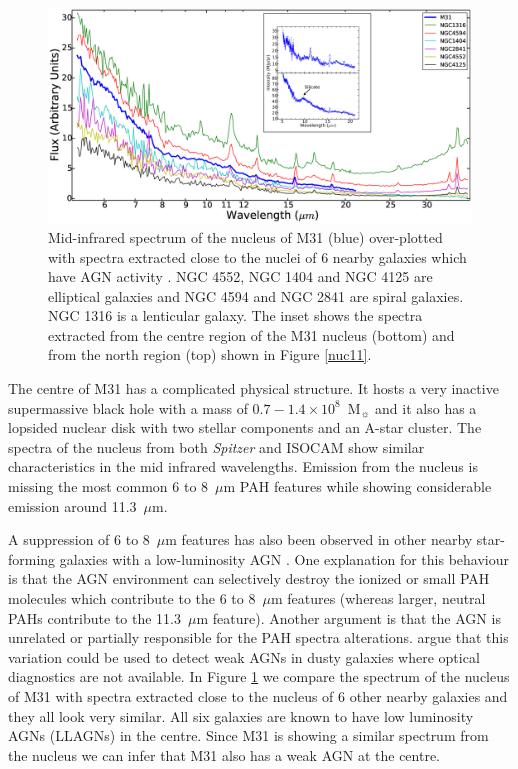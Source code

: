 \begin{figure}
\centering
\includegraphics[height = 8 cm]{./SINGSspec.eps}
\caption{Mid-infrared spectrum of the nucleus of M31 (blue) over-plotted with spectra extracted close to the nuclei of 6 nearby galaxies which have 
AGN activity \citep{Smith:2007lr}. NGC 4552, NGC 1404 and NGC 4125 are elliptical galaxies and NGC 4594 and NGC 2841 are spiral galaxies. 
NGC 1316 is a lenticular galaxy. The inset shows the spectra extracted from the centre region of the M31 nucleus (bottom) and from the north region (top) 
shown in Figure \ref{nuc11}.}
\label{smithspec}
\end{figure}

The centre of M31 has a complicated physical structure. It hosts a very inactive supermassive black hole with a mass of 
$0.7-1.4 \times 10^8$~M$_{\sun}$ \citep{Bacon2001} and it also has a lopsided nuclear disk \citep{Lauer1993} with two stellar components and an A-star cluster. 
The spectra of the nucleus from both {\em Spitzer} and ISOCAM show similar characteristics in the mid infrared wavelengths. 
Emission from the nucleus is missing the most common 6 to 8~$\mu$m PAH features while showing considerable emission around 11.3~$\mu$m. 

A suppression of 6 to 8~$\mu$m features has also been observed in other nearby star-forming galaxies with a low-luminosity AGN \citep{Smith:2007lr}. 
One explanation for this behaviour is that the AGN environment can selectively destroy the ionized or small PAH molecules which contribute to the 6 to 8~$\mu$m 
features (whereas larger, neutral PAHs contribute to the 11.3~$\mu$m feature). Another argument is that the AGN is unrelated or partially responsible for the PAH spectra alterations. \citet{Smith:2007lr} argue that this variation could be used to detect weak AGNs in dusty galaxies where optical diagnostics are not available. 
In Figure \ref{smithspec} we compare the spectrum of the nucleus of M31 with spectra extracted close to the nucleus of 6 other nearby galaxies and they 
all look very similar. All six galaxies are known to have low luminosity AGNs (LLAGNs) in the centre. Since M31 is showing a similar spectrum from the 
nucleus we can infer that  M31 also has a weak AGN at the centre.

